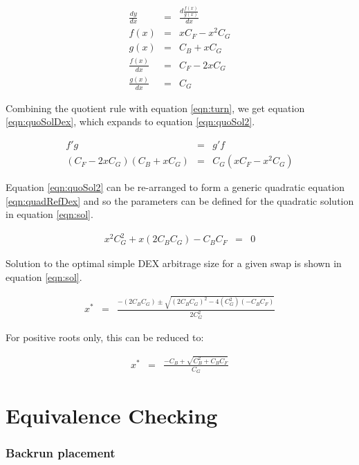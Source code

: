 \documentclass[runningheads]{llncs}
\begin{document}
\begin{eqnarray}
	\frac{dy}{dx} &=& \frac{d \frac{ f(x)}{g(x)}}{dx} \label{eqn:turn2}\\
	f(x) &=& x C_{F} - x^2 C_{G} \label{eqn:f}\\
	g(x) &=& C_{B} + x C_{G} \label{eqn:g}\\
	\frac{f(x)}{dx} &=& C_{F} - 2 x C_{G} \label{eqn:fdash}\\
	\frac{g(x)}{dx} &=& C_{G} \label{eqn:gdash}
\end{eqnarray}

Combining the quotient rule with equation \ref{eqn:turn}, we get equation \ref{eqn:quoSolDex}, which expands to equation \ref{eqn:quoSol2}.

\begin{eqnarray}
	f'g &=& g'f \label{eqn:quoSolDex}\\
	(C_{F} - 2 x C_{G})(C_{B} + x C_{G}) &=& C_{G} ( x C_{F} - x^2 C_{G}) \label{eqn:quoSol2}
\end{eqnarray}

Equation \ref{eqn:quoSol2} can be re-arranged to form a generic quadratic equation \ref{eqn:quadRefDex} and so the parameters can be defined for the quadratic solution in equation \ref{eqn:sol}.

\begin{eqnarray}
	x^2 C_{G}^2 + x(2 C_{B} C_{G}) - C_{B} C_{F} &=& 0 \label{eqn:quadRefDex}
\end{eqnarray}

Solution to the optimal simple DEX arbitrage size for a given swap is shown in equation \ref{eqn:sol}.

\begin{eqnarray}
	x^* &=& \frac{-(2 C_{B} C_{G}) \pm \sqrt{(2 C_{B} C_{G})^2 - 4(C_{G}^2)(- C_{B} C_{F})}}{2 C_{G}^2} \label{eqn:sol}
\end{eqnarray}

For positive roots only, this can be reduced to:

\begin{eqnarray}
	x^* &=& \frac{- C_{B} + \sqrt{C_{B} ^2 + C_{B} C_{F}}}{C_{G}} \label{eqn:sol2}
\end{eqnarray}


\chapter{Equivalence Checking}

\subsection{Backrun placement}
\end{document}
